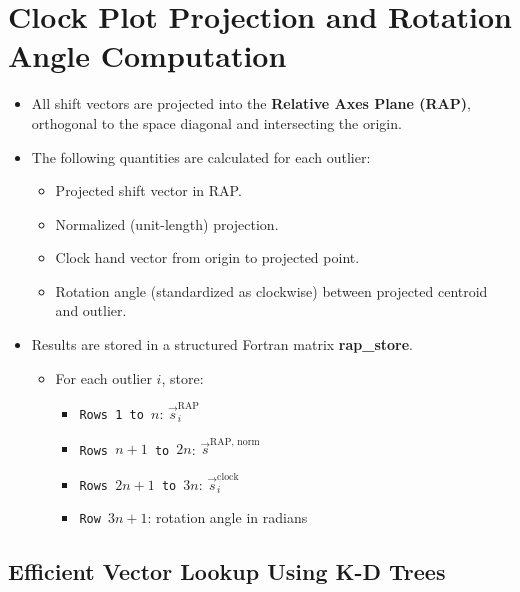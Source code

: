 \section{Clock Plot Projection and Rotation Angle Computation}\label{sec:rap}
    \begin{itemize}
        \item All shift vectors are projected into the \textbf{Relative Axes Plane (RAP)},
              orthogonal to the space diagonal and intersecting the origin.
        \item The following quantities are calculated for each outlier:
              \begin{itemize}
                  \item Projected shift vector in RAP.
                  \item Normalized (unit-length) projection.
                  \item Clock hand vector from origin to projected point.
                  \item Rotation angle (standardized as clockwise) between projected centroid and outlier.
              \end{itemize}
        \item Results are stored in a structured Fortran matrix \textbf{rap\_store}.
              \begin{itemize}
                  \item For each outlier \( i \), store:
                  \begin{itemize}
                      \item \texttt{Rows 1 to \( n \)}: \( \vec{s}_i^{\text{RAP}} \)
                      \item \texttt{Rows \( n+1 \) to \( 2n \)}: \( \vec{s}^{\text{RAP, norm}} \)
                      \item \texttt{Rows \( 2n+1 \) to \( 3n \)}: \( \vec{s}_i^{\text{clock}} \)
                      \item \texttt{Row \( 3n+1 \)}: rotation angle in radians
                  \end{itemize}
              \end{itemize}
    \end{itemize}

    \subsection{Efficient Vector Lookup Using K-D Trees}\label{sec:kdtree}

